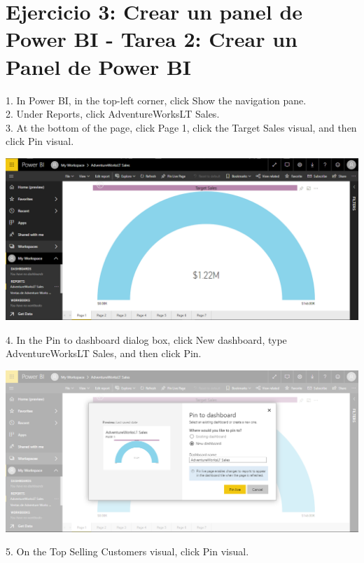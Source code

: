 \section{Ejercicio 3: Crear un panel de Power BI - Tarea 2: Crear un Panel de Power BI} 

1. In Power BI, in the top-left corner, click Show the navigation pane.\\
2. Under Reports, click AdventureWorksLT Sales.\\
3. At the bottom of the page, click Page 1, click the Target Sales visual, and then click Pin visual.\\

	\begin{center}
	\includegraphics[width=17cm]{./Imagenes/Ejercicio3/Tarea2/1}
	\end{center}	

4. In the Pin to dashboard dialog box, click New dashboard, type AdventureWorksLT Sales, and
then click Pin.\\

	\begin{center}
	\includegraphics[width=17cm]{./Imagenes/Ejercicio3/Tarea2/2}
	\end{center}	

5. On the Top Selling Customers visual, click Pin visual.\\


